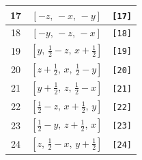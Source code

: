 \documentclass[fleqn,8pt]{jsarticle}
\begin{document}
\begin{longtable}{ccc}
17 & $\left[ - z,\, - x,\, - y \right]$ & {\tt [17]} \\ \hline
18 & $\left[ - y,\, - z,\, - x \right]$ & {\tt [18]} \\ \hline
19 & $\left[ y,\, \frac{1}{2} - z,\, x + \frac{1}{2} \right]$ & {\tt [19]} \\ \hline
20 & $\left[ z + \frac{1}{2},\, x,\, \frac{1}{2} - y \right]$ & {\tt [20]} \\ \hline
21 & $\left[ y + \frac{1}{2},\, z,\, \frac{1}{2} - x \right]$ & {\tt [21]} \\ \hline
22 & $\left[ \frac{1}{2} - z,\, x + \frac{1}{2},\, y \right]$ & {\tt [22]} \\ \hline
23 & $\left[ \frac{1}{2} - y,\, z + \frac{1}{2},\, x \right]$ & {\tt [23]} \\ \hline
24 & $\left[ z,\, \frac{1}{2} - x,\, y + \frac{1}{2} \right]$ & {\tt [24]} \\
\end{longtable}
\end{document}

